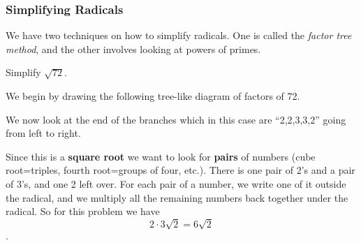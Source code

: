 \newpage
\subsubsection{Simplifying Radicals}

We have two techniques on how to simplify radicals. One is called the \emph{factor tree method},
and the other involves looking at powers of primes.

\begin{exercise}
Simplify $\sqrt{72}$.
\end{exercise}
\begin{solution}[2in]
We begin by drawing the following tree-like diagram of factors of 72.
\begin{center}
\end{center}
We now look at the end of the branches which in this case are ``2,2,3,3,2''
going from left to right.

Since this is a \textbf{square root} we want to look for \textbf{pairs} of numbers
(cube root=triples, fourth root=groups of four, etc.). There is one pair of 2's and
a pair of 3's, and one 2 left over. For each pair of a number, we write one of it
outside the radical, and we multiply all the remaining numbers back together under
the radical. So for this problem we have
\[
2\cdot3\sqrt{2}=6\sqrt{2}
\]
.
\end{solution}
\vspace{0.5em}

